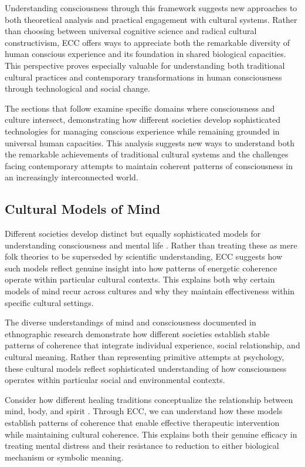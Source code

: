 \begin{refsection}
Understanding consciousness through this framework suggests new approaches to both theoretical analysis and practical engagement with cultural systems. Rather than choosing between universal cognitive science and radical cultural constructivism, ECC offers ways to appreciate both the remarkable diversity of human conscious experience and its foundation in shared biological capacities. This perspective proves especially valuable for understanding both traditional cultural practices and contemporary transformations in human consciousness through technological and social change.

The sections that follow examine specific domains where consciousness and culture intersect, demonstrating how different societies develop sophisticated technologies for managing conscious experience while remaining grounded in universal human capacities. This analysis suggests new ways to understand both the remarkable achievements of traditional cultural systems and the challenges facing contemporary attempts to maintain coherent patterns of consciousness in an increasingly interconnected world.

\subsection{Cultural Models of Mind}

Different societies develop distinct but equally sophisticated models for understanding consciousness and mental life \cite{luhrmann2012when}. Rather than treating these as mere folk theories to be superseded by scientific understanding, ECC suggests how such models reflect genuine insight into how patterns of energetic coherence operate within particular cultural contexts. This explains both why certain models of mind recur across cultures and why they maintain effectiveness within specific cultural settings.

The diverse understandings of mind and consciousness documented in ethnographic research \cite{hollan2000constructivist} demonstrate how different societies establish stable patterns of coherence that integrate individual experience, social relationship, and cultural meaning. Rather than representing primitive attempts at psychology, these cultural models reflect sophisticated understanding of how consciousness operates within particular social and environmental contexts.

Consider how different healing traditions conceptualize the relationship between mind, body, and spirit \cite{csordas1994sacred}. Through ECC, we can understand how these models establish patterns of coherence that enable effective therapeutic intervention while maintaining cultural coherence. This explains both their genuine efficacy in treating mental distress and their resistance to reduction to either biological mechanism or symbolic meaning.


\end{refsection}
